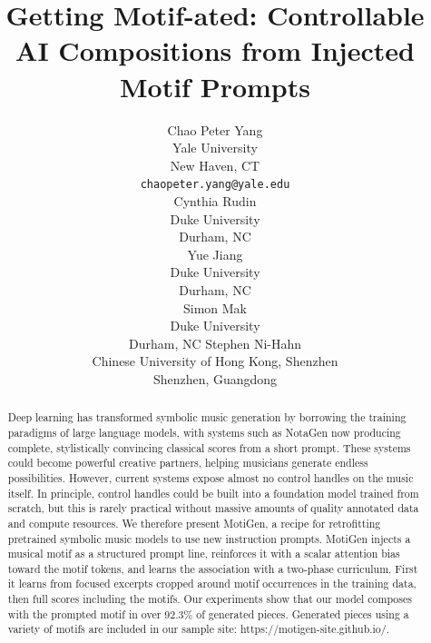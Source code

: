\documentclass{article}
\title{Getting Motif-ated: Controllable AI Compositions from Injected Motif Prompts}
\author{%
  Chao Peter Yang \\
  Yale University\\
  New Haven, CT\\
  \texttt{chaopeter.yang@yale.edu} \\
  \And
    Cynthia Rudin \\
  Duke University\\
  Durham, NC\\
  \And
  Yue Jiang\\
  Duke University\\
  Durham, NC\\
  \AND
  Simon Mak\\
  Duke University \\
  Durham, NC
  \And
  Stephen Ni-Hahn \\
  Chinese University of Hong Kong, Shenzhen \\
  Shenzhen, Guangdong \\
}
\newcommand{\method}{MotiGen}
\begin{document}
\maketitle

\begin{abstract}
Deep learning has transformed symbolic music generation by borrowing the training paradigms of large language models, with systems such as NotaGen now producing complete, stylistically convincing classical scores from a short prompt. These systems could become powerful creative partners, helping musicians generate endless possibilities. However, current systems expose almost no control handles on the music itself. In principle, control handles could be built into a foundation model trained from scratch, but this is rarely practical without massive amounts of quality annotated data and compute resources. We therefore present \method{}, a recipe for retrofitting pretrained symbolic music models to use new instruction prompts. \method{} injects a musical motif as a structured prompt line, reinforces it with a scalar attention bias toward the motif tokens, and learns the association with a two-phase curriculum. First it learns from focused excerpts cropped around motif occurrences in the training data, then full scores including the motifs. Our experiments show that our model composes with the prompted motif in over 92.3\% of generated pieces. Generated pieces using a variety of motifs are included in our sample site: https://motigen-site.github.io/.
\end{abstract}




\end{document}
